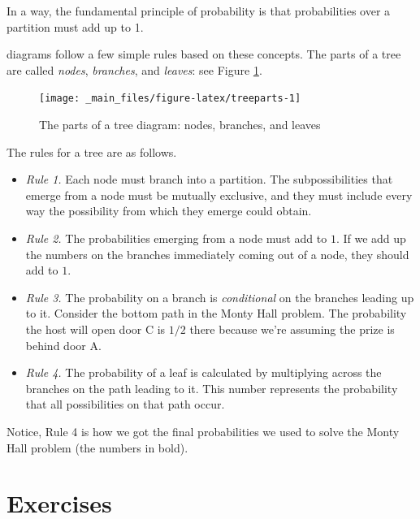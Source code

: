 \documentclass[justified]{tufte-book}
\begin{document}
In a way, the fundamental principle of probability is that probabilities over a partition must add up to 1.

 diagrams follow a few simple rules based on these concepts. The parts of a tree are called \emph{nodes}, \emph{branches}, and \emph{leaves}: see Figure \ref{fig:treeparts}.

\begin{figure}
\texttt{[image: \_main\_files/figure-latex/treeparts-1]} \caption[The parts of a tree diagram]{The parts of a tree diagram: nodes, branches, and leaves}\label{fig:treeparts}
\end{figure}

The rules for a tree are as follows.

\begin{itemize}
\item
  \emph{Rule 1.} Each node must branch into a partition. The subpossibilities that emerge from a node must be mutually exclusive, and they must include every way the possibility from which they emerge could obtain.
\item
  \emph{Rule 2.} The probabilities emerging from a node must add to \(1\). If we add up the numbers on the branches immediately coming out of a node, they should add to \(1\).
\item
  \emph{Rule 3.} The probability on a branch is \emph{conditional} on the branches leading up to it. Consider the bottom path in the Monty Hall problem. The probability the host will open door C is \(1/2\) there because we're assuming the prize is behind door A.
\item
  \emph{Rule 4.} The probability of a leaf is calculated by multiplying across the branches on the path leading to it. This number represents the probability that all possibilities on that path occur.
\end{itemize}

Notice, Rule 4 is how we got the final probabilities we used to solve the Monty Hall problem (the numbers in bold).

\hypertarget{exercises}{%
\section*{Exercises}\label{exercises}}
\end{document}
